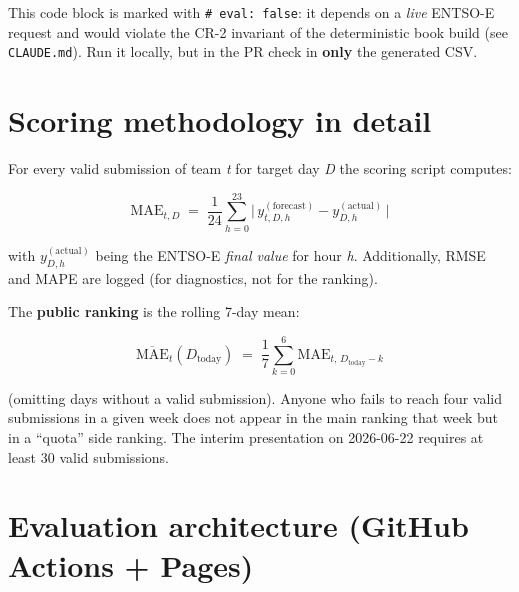\documentclass[
  english,
  letterpaper,
]{scrbook}
\begin{document}
\begin{tcolorbox}[enhanced jigsaw, arc=.35mm, bottomrule=.15mm, bottomtitle=1mm, breakable, colback=white, colbacktitle=quarto-callout-warning-color!10!white, colframe=quarto-callout-warning-color-frame, coltitle=black, left=2mm, leftrule=.75mm, opacityback=0, opacitybacktitle=0.6, rightrule=.15mm, title=\textcolor{quarto-callout-warning-color}{\faExclamationTriangle}\hspace{0.5em}{Live code not executed in the book}, titlerule=0mm, toprule=.15mm, toptitle=1mm]

This code block is marked with \texttt{\#\textbar{}\ eval:\ false}: it
depends on a \emph{live} ENTSO-E request and would violate the CR-2
invariant of the deterministic book build (see \texttt{CLAUDE.md}). Run
it locally, but in the PR check in \textbf{only} the generated CSV.

\end{tcolorbox}

\section{Scoring methodology in
detail}\label{scoring-methodology-in-detail}

For every valid submission of team \emph{t} for target day \emph{D} the
scoring script computes:

\[
\text{MAE}_{t,D} \;=\; \frac{1}{24} \sum_{h=0}^{23}
\bigl|\, y^{(\text{forecast})}_{t,D,h} - y^{(\text{actual})}_{D,h} \,\bigr|
\]

with \(y^{(\text{actual})}_{D,h}\) being the ENTSO-E \emph{final value}
for hour \emph{h}. Additionally, RMSE and MAPE are logged (for
diagnostics, not for the ranking).

The \textbf{public ranking} is the rolling 7-day mean:

\[
\overline{\text{MAE}}_t(D_{\text{today}}) \;=\;
\frac{1}{7} \sum_{k=0}^{6} \text{MAE}_{t,\,D_{\text{today}} - k}
\]

(omitting days without a valid submission). Anyone who fails to reach
four valid submissions in a given week does not appear in the main
ranking that week but in a ``quota'' side ranking. The interim
presentation on 2026-06-22 requires at least 30 valid submissions.

\section{Evaluation architecture (GitHub Actions +
Pages)}\label{evaluation-architecture-github-actions-pages}
\end{document}
